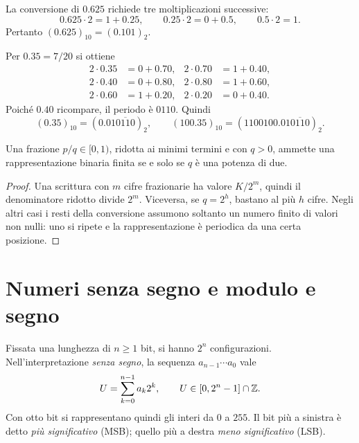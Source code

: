 \begin{example}
La conversione di \(0.625\) richiede tre moltiplicazioni successive:
\[
  0.625\cdot2=1+0.25,\qquad
  0.25\cdot2=0+0.5,\qquad
  0.5\cdot2=1.
\]
Pertanto \((0.625)_{10}=(0.101)_2\).
\end{example}

\begin{example}
\label{ex:fi-frazione-periodica}
Per \(0.35=7/20\) si ottiene
\begin{align*}
  2\cdot0.35&=0+0.70, & 2\cdot0.70&=1+0.40,\\
  2\cdot0.40&=0+0.80, & 2\cdot0.80&=1+0.60,\\
  2\cdot0.60&=1+0.20, & 2\cdot0.20&=0+0.40.
\end{align*}
Poiché \(0.40\) ricompare, il periodo è \(0110\). Quindi
\[
  (0.35)_{10}=(0.01\overline{0110})_2,
  \qquad
  (100.35)_{10}=(1100100.01\overline{0110})_2.
\]
\end{example}

\begin{proposition}
\label{prop:fi-frazione-binaria-finita}
Una frazione \(p/q\in[0,1)\), ridotta ai minimi termini e con \(q>0\),
ammette una rappresentazione binaria finita se e solo se \(q\) è una
potenza di due.
\end{proposition}

\begin{proof}
Una scrittura con \(m\) cifre frazionarie ha valore \(K/2^m\), quindi
il denominatore ridotto divide \(2^m\). Viceversa, se \(q=2^h\), bastano
al più \(h\) cifre. Negli altri casi i resti della conversione assumono
soltanto un numero finito di valori non nulli: uno si ripete e la
rappresentazione è periodica da una certa posizione.
\end{proof}

\section{Numeri senza segno e modulo e segno}
\label{sec:fi-interi-rappresentazione}

Fissata una lunghezza di \(n\ge1\) bit, si hanno \(2^n\) configurazioni.
Nell'interpretazione \emph{senza segno}, la sequenza \(a_{n-1}\cdots a_0\) vale
\[
  U=\sum_{k=0}^{n-1}a_k2^k,
  \qquad U\in[0,2^n-1]\cap\mathbb{Z}.
\]
Con otto bit si rappresentano quindi gli interi da \(0\) a \(255\).
Il bit più a sinistra è detto \emph{più significativo} (MSB); quello
più a destra \emph{meno significativo} (LSB).

